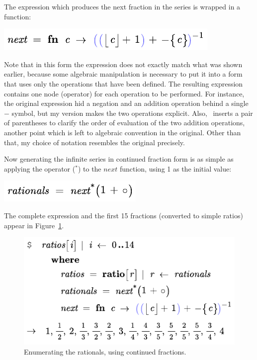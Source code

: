 The expression which produces the next fraction in the series is wrapped in a function:
\begin{center}
\includegraphics[scale=1]{src/image/rationals-next.pdf}
\end{center}
Note that in this form the expression does not exactly match what was shown earlier, because some algebraic manipulation is necessary to put it into a form that uses only the operations that have been defined. The resulting expression contains one node (operator) for each operation to be performed. For instance, the original expression hid a negation and an addition operation behind a single $-$ symbol, but my version makes the two operations explicit. Also, \Meta\ inserts a pair of parentheses to clarify the order of evaluation of the two addition operations, another point which is left to algebraic convention in the original. Other than that, my choice of notation resembles the original precisely.

Now generating the infinite series in continued fraction form is as simple as applying the  operator (${}^*$) to the $\mathit{next}$ function, using 1 as the initial value:
\begin{center}
\includegraphics[scale=1]{src/image/rationals-iter.pdf}
\end{center}
The complete expression and the first 15 fractions (converted to simple ratios) appear in Figure~\ref{fig-rationals}. 


\begin{figure}[t]
  \centering
    
  \includegraphics[scale=0.8]{src/image/rationals.pdf}
  
  \caption{Enumerating the rationals, using continued fractions.}
  \label{fig-rationals}
\end{figure}

